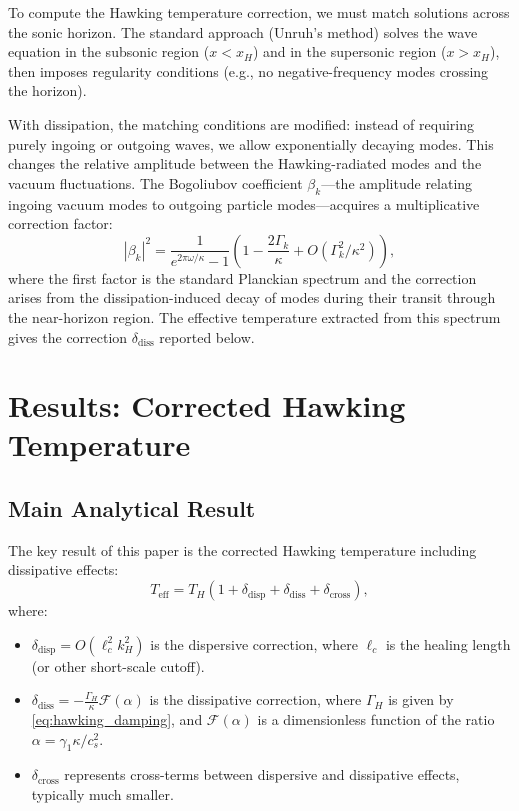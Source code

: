 \documentclass[aps,prl,twocolumn,superscriptaddress,nofootinbib,amsmath,amssymb]{revtex4-2}
\begin{document}
To compute the Hawking temperature correction, we must match solutions across the sonic horizon. The standard approach (Unruh's method) solves the wave equation in the subsonic region ($x < x_H$) and in the supersonic region ($x > x_H$), then imposes regularity conditions (e.g., no negative-frequency modes crossing the horizon).

With dissipation, the matching conditions are modified: instead of requiring purely ingoing or outgoing waves, we allow exponentially decaying modes. This changes the relative amplitude between the Hawking-radiated modes and the vacuum fluctuations. The Bogoliubov coefficient $\beta_k$---the amplitude relating ingoing vacuum modes to outgoing particle modes---acquires a multiplicative correction factor:
\begin{equation}
|\beta_k|^2 = \frac{1}{e^{2\pi\omega/\kappa} - 1} \left(1 - \frac{2\Gamma_k}{\kappa} + O(\Gamma_k^2/\kappa^2)\right),
\end{equation}
where the first factor is the standard Planckian spectrum and the correction arises from the dissipation-induced decay of modes during their transit through the near-horizon region. The effective temperature extracted from this spectrum gives the correction $\delta_{\text{diss}}$ reported below.

\section{Results: Corrected Hawking Temperature}
\label{sec:results}

\subsection{Main Analytical Result}

The key result of this paper is the corrected Hawking temperature including dissipative effects:
\begin{equation}
\label{eq:main_result}
T_{\text{eff}} = T_H \left(1 + \delta_{\text{disp}} + \delta_{\text{diss}} + \delta_{\text{cross}} \right),
\end{equation}
where:
\begin{itemize}
\item $\delta_{\text{disp}} = O(\ell_c^2 k_H^2)$ is the dispersive correction, where $\ell_c$ is the healing length (or other short-scale cutoff).
\item $\delta_{\text{diss}} = -\frac{\Gamma_H}{\kappa} \mathcal{F}(\alpha)$ is the dissipative correction, where $\Gamma_H$ is given by \eqref{eq:hawking_damping}, and $\mathcal{F}(\alpha)$ is a dimensionless function of the ratio $\alpha = \gamma_1 \kappa / c_s^2$.
\item $\delta_{\text{cross}}$ represents cross-terms between dispersive and dissipative effects, typically much smaller.
\end{itemize}
\end{document}
